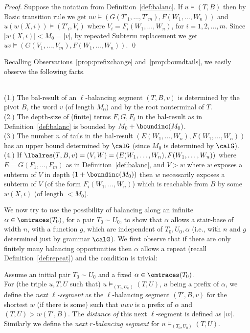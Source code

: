 \documentclass[12pt]{article}
\begin{document}
\begin{proof}
Suppose the notation from Definition~\ref{def:balanc}. If  
$u\models(T,B)$ then by Basic transition rule we get
$uv\models(G(T'_1,\dots,T'_m),F(W_1,\dots,W_n))$
and  
$u(w(X,i))\models (T'_i,V_i)$ where
$V_i=F_i(W_1,\dots,W_n)$, for $i=1,2,\dots,m$.
Since $|w(X,i)|<M_0=|v|$, by repeated Subterm replacement 
we get
$uv\models(G(V_1,\dots,V_m),F(W_1,\dots,W_n))$.
\qed
\end{proof}

\noindent
Recalling Observations~\ref{prop:prefixchange}
and~\ref{prop:boundtails}, 
we easily observe the following facts.


\begin{observ}\label{prop:balbounds}
\hfill
\\
(1.) The bal-result of an $\ell$-balancing segment $(T,B,v)$ is determined
by the pivot $B$, the word $v$ (of length $M_0$) and by
the root nonterminal of $T$.
\\
(2.) The depth-size of (finite) terms
$F,G,F_i$ in the bal-result as in 
Definition~\ref{def:balanc} 
is bounded by $M_0+\boundinc(M_0)$. 
\\
(3.) The number $n$ of tails in the bal-result 
$(E(W_1,\dots,W_n),F(W_1,\dots,W_n))$
has an upper bound determined by $\calG$ (since $M_0$ is determined by
$\calG$).
\\
(4.)
If $\lbalres(T,B,v)=(V,W)=(E(W_1,\dots,W_n),F(W_1,\dots,W_n))$
where $E=G(F_1,\dots,F_m)$ as in 
Definition~\ref{def:balanc},  
and $V\gt{w}$ where $w$ exposes a subterm of $V$ in depth 
$(1+\boundinc(M_0))$ then $w$ necessarily exposes a
subterm of $V$ (of the form $F_i(W_1,\dots,W_n)$) 
which is reachable from $B$ by some $w(X,i)$ (of length
$<M_0$).
\end{observ}
We now try to use the possibility of balancing along
an infinite $\alpha\in\omtraces(T_0)$, for a pair $T_0\sim U_0$,
to show that 
$\alpha$ allows
a stair-base of width $n$, with a function $g$, 
which are independent of $T_0,U_0,\alpha$
(i.e., with $n$ and $g$ determined just by grammar $\calG$).
We first observe that if there are only
finitely many balancing opportunities then
$\alpha$ allows a repeat (recall Definition~\ref{def:repeat})
and the condition is trivial:

\begin{defn}\label{def:nextbal}
Assume an initial pair $T_0\sim U_0$ and a fixed 
$\alpha\in\omtraces(T_0)$. 
\\
For (the triple $u,T,U$ such that)
$u\models_{(T_0,U_0)} (T,U)$, $u$ being a prefix of
$\alpha$, we define the 
\emph{next $\ell$-segment} as the $\ell$-balancing segment $(T',B,v)$ 
for the shortest $w$ (if there is some)
such that $uwv$ is a prefix of $\alpha$ and $(T,U)\gt{w}(T',B)$. 
The \emph{distance of} this next $\ell$-segment is defined as $|w|$. 
Similarly we define the 
\emph{next $r$-balancing segment} for  $u\models_{(T_0,U_0)} (T,U)$.
\end{defn}
\end{document}
